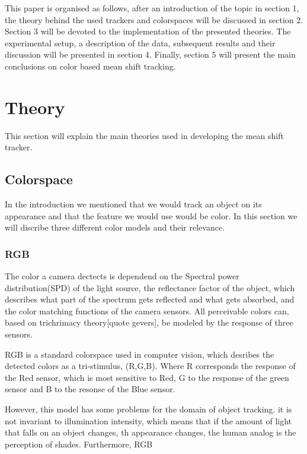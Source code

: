 \documentclass[a4paper,11pt]{article}
\begin{document}
	This paper is organised as follows, after an introduction of the topic in section 1, the theory behind the used trackers and colorspaces will be discussed in section 2.
	Section 3 will be devoted to the implementation of the presented theories. The experimental setup, a description of the data, subsequent results and their discussion will be presented in section 4. 
	Finally, section 5 will present the main conclusions on color based mean shift tracking.

\section{Theory}	
	This section will explain the main theories used in developing the mean shift tracker. 
	\subsection{Colorspace}
		In the introduction we mentioned that we would track an object on its appearance and that the feature we would use would be color. In this section we will discribe three different color models and their relevance.

		\subsubsection{RGB}
		The color a camera dectects is dependend on the Spectral power distribution(SPD) of the light source, the reflectance factor of the object, which describes what part of the spectrum gets reflected and what gets absorbed, and the color matching functions of the camera sensors. 
		All perceivable colors can, based on trichrimacy theory[quote gevers], be modeled by the response of three sensors. 
		
		RGB is a standard colorspace used in computer vision, which desribes the detected colors as a tri-stimulus, (R,G,B). Where R corresponds the response of the Red sensor, which is most sensitive to Red, G to the response of the green sensor and B to the resonse of the Blue sensor.

		However, this model has some problems for the domain of object tracking. it is not invariant to illumination intensity, which means that if the amount of light that falls on an object changes, th appearance changes, the human analog is the perception of shades. 
		Furthermore, RGB 
		
\end{document}
